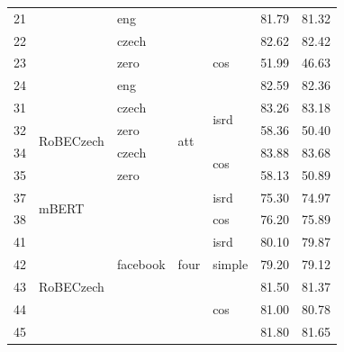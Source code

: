 \begin{table}[]
{\begin{tabular}{|l|l|l|l|l||ll|}
21 &                            & eng                       &   &                      & 81.79   & 81.32 \\ \cline{1-1} \cline{3-3} \cline{6-7}
22 &                            & czech                     &   &\multirow{3}{*}{cos}  & 82.62   & 82.42 \\ \cline{1-1} \cline{3-3} \cline{6-7}
23 &                            & zero                      &   &                      & 51.99   & 46.63 \\ \cline{1-1} \cline{3-3} \cline{6-7}
24 &                            & eng                       &   &                      & 82.59   & 82.36 \\ \hline
31 & \multirow{4}{*}{RoBECzech} & czech                     &  \multirow{4}{*}{att}  &\multirow{2}{*}{isrd} & 83.26   & 83.18 \\ \cline{1-1} \cline{3-3} \cline{6-7}
32 &                            & zero                      &   &                      & 58.36   & 50.40 \\ \cline{1-1} \cline{3-3}\cline{6-7}
34 &                            & czech                     &   &\multirow{2}{*}{cos}  & 83.88   & 83.68 \\ \cline{1-1} \cline{3-3} \cline{6-7}
35 &                            & zero                      &   &                      & 58.13   & 50.89 \\ \hline
37 & \multirow{2}{*}{mBERT}     & \multirow{11}{*}{facebook} &  \multirow{7}{*}{four}  & isrd                  & 75.30   & 74.97 \\ \cline{1-1} \cline{5-7}
38 &                            &                           &    & cos                   & 76.20   & 75.89 \\ \cline{1-2}  \cline{5-7}
41 & \multirow{5}{*}{RoBECzech} &                           &    & isrd                  & 80.10   & 79.87 \\ \cline{1-1}  \cline{5-7}
42 &                            &                           &    & simple                & 79.20   & 79.12 \\ \cline{1-1}  \cline{5-7}
43 &                            &                           &    & \multirow{3}{*}{cos}  & 81.50   & 81.37 \\ \cline{1-1}  \cline{6-7}
44 &                            &                           &    &                       & 81.00   & 80.78 \\ \cline{1-1}  \cline{6-7}
45 &                            &                           &    &                       & 81.80   & 81.65 \\ \cline{1-2} \cline{4-7}

\end{tabular}}
\end{table}
